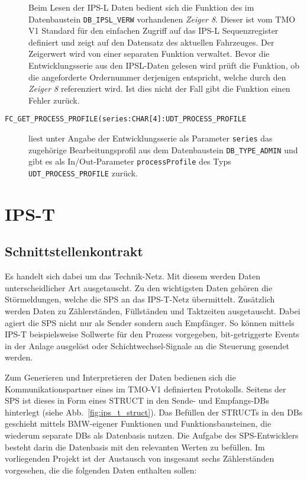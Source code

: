\begin{description}
    Beim Lesen der IPS-L Daten bedient sich die Funktion des im Datenbaustein \texttt{DB\_IPSL\_VERW} vorhandenen \emph{Zeiger 8}. Dieser ist vom TMO V1 Standard für den einfachen Zugriff auf das IPS-L Sequenzregister definiert und zeigt auf den Datensatz des aktuellen Fahrzeuges. Der Zeigerwert wird von einer separaten Funktion verwaltet. Bevor die Entwicklungsserie aus den IPSL-Daten gelesen wird prüft die Funktion, ob die angeforderte Ordernummer derjenigen entspricht, welche durch den \emph{Zeiger 8} referenziert wird. Ist dies nicht der Fall gibt die Funktion einen Fehler zurück.\leer
    
    \item [\texttt{FC\_GET\_PROCESS\_PROFILE(series:CHAR[4]:UDT\_PROCESS\_PROFILE}] liest unter Angabe der Entwicklungsserie als Parameter \texttt{series} das zugehörige Bearbeitungsprofil aus dem Datenbaustein \texttt{DB\_TYPE\_ADMIN} und gibt es als In/Out-Parameter \texttt{processProfile} des Typs \texttt{UDT\_PROCESS\_PROFILE} zurück.
    
\end{description}


\section{IPS-T}
\label{sec:ips_t}

\subsection{Schnittstellenkontrakt}
\label{subsec:ips_t_contract}

 Es handelt sich dabei um das Technik-Netz. Mit diesem werden Daten unterscheidlicher Art ausgetauscht. Zu den wichtigsten Daten gehören die Störmeldungen, welche die SPS an das IPS-T-Netz übermittelt. Zusätzlich werden Daten zu Zählerständen, Füllständen und Taktzeiten ausgetauscht. Dabei agiert die SPS nicht nur als Sender sondern auch Empfänger. So können mittels IPS-T beispielsweise Sollwerte für den Prozess  vorgegeben, bit-getriggerte Events in der Anlage ausgelöst oder Schichtwechsel-Signale an die Steuerung gesendet werden. 


Zum Generieren und Interpretieren der Daten bedienen sich die Kommunikationspartner eines im TMO-V1 definierten Protokolls. Seitens der SPS ist dieses in Form eines STRUCT in den Sende- und Empfangs-DBs hinterlegt (siehe Abb.~\ref{fig:ips_t_struct}). Das Befüllen der STRUCTs in den DBs geschieht mittels BMW-eigener Funktionen und Funktionsbausteinen, die wiederum separate DBs als Datenbasis nutzen. Die Aufgabe des SPS-Entwicklers besteht darin die Datenbasis mit den relevanten Werten zu befüllen. Im vorliegenden Projekt ist der Austausch von insgesamt sechs Zählerständen vorgesehen, die die folgenden Daten enthalten sollen:

